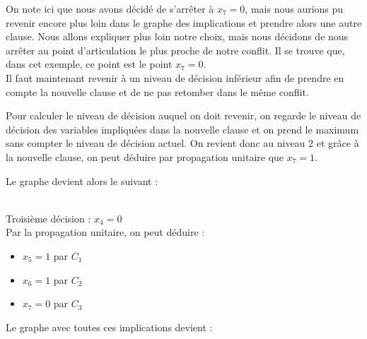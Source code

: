 \documentclass[12pt]{extarticle}
\begin{document}
On note ici que nous avons décidé de s'arrêter à $x_7 = 0$, mais nous aurions pu revenir encore plus loin dans le graphe des implications et prendre alors une autre clause. Nous allons expliquer plus loin notre choix, mais nous décidons de nous arrêter au point d'articulation le plus proche de notre conflit. Il se trouve que, dans cet exemple, ce point est le point $x_7 = 0$. \\

Il faut maintenant revenir à un niveau de décision inférieur afin de prendre en compte la nouvelle clause et de ne pas retomber dans le même conflit.

Pour calculer le niveau de décision auquel on doit revenir, on regarde le niveau de décision des variables impliquées dans la nouvelle clause et on prend le maximum sans compter le niveau de décision actuel.
On revient donc au niveau 2 et grâce à la nouvelle clause, on peut déduire par propagation unitaire que $x_7 = 1$.

Le graphe devient alors le suivant : \\

 \\
Troisième décision : $x_4 = 0$ \\
Par la propagation unitaire, on peut déduire  :
\begin{itemize}
    \item $x_5 = 1$ par $C_1$
    \item $x_6 = 1$ par $C_2$
    \item $x_7 = 0$ par $C_3$
\end{itemize}
Le graphe avec toutes ces implications devient : \\

 \\
\end{document}
